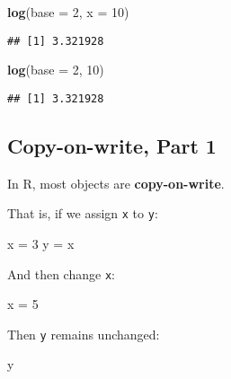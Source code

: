 \documentclass[
]{article}
\newenvironment{Shaded}{\begin{snugshade}}{\end{snugshade}}
\newcommand{\DataTypeTok}[1]{\textcolor[rgb]{0.13,0.29,0.53}{#1}}
\newcommand{\DecValTok}[1]{\textcolor[rgb]{0.00,0.00,0.81}{#1}}
\newcommand{\KeywordTok}[1]{\textcolor[rgb]{0.13,0.29,0.53}{\textbf{#1}}}
\newcommand{\NormalTok}[1]{#1}
\newcommand{\StringTok}[1]{\textcolor[rgb]{0.31,0.60,0.02}{#1}}
\begin{document}
\begin{Shaded}
\begin{Highlighting}[]
\KeywordTok{log}\NormalTok{(}\DataTypeTok{base =} \DecValTok{2}\NormalTok{, }\DataTypeTok{x =} \DecValTok{10}\NormalTok{)}
\end{Highlighting}
\end{Shaded}

\begin{verbatim}
## [1] 3.321928
\end{verbatim}

\begin{Shaded}
\begin{Highlighting}[]
\KeywordTok{log}\NormalTok{(}\DataTypeTok{base =} \DecValTok{2}\NormalTok{, }\DecValTok{10}\NormalTok{)}
\end{Highlighting}
\end{Shaded}

\begin{verbatim}
## [1] 3.321928
\end{verbatim}

\hypertarget{copy-on-write-part-1}{%
\subsection{Copy-on-write, Part 1}\label{copy-on-write-part-1}}

In R, most objects are \textbf{copy-on-write}.

That is, if we assign \texttt{x} to \texttt{y}:

\begin{Shaded}
\begin{Highlighting}[]
\NormalTok{x =}\StringTok{ }\DecValTok{3}
\NormalTok{y =}\StringTok{ }\NormalTok{x}
\end{Highlighting}
\end{Shaded}

And then change \texttt{x}:

\begin{Shaded}
\begin{Highlighting}[]
\NormalTok{x =}\StringTok{ }\DecValTok{5}
\end{Highlighting}
\end{Shaded}

Then \texttt{y} remains unchanged:

\begin{Shaded}
\begin{Highlighting}[]
\NormalTok{y}
\end{Highlighting}
\end{Shaded}
\end{document}

